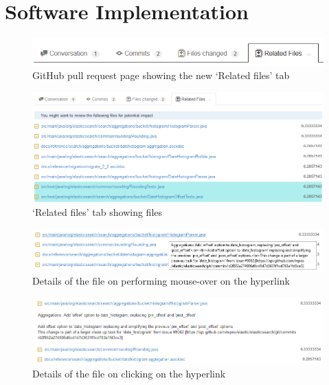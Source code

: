 
\section{Software Implementation}
\label{sec:setup}

\begin{figure}[ht!]
\centering
\includegraphics[width=16cm]{NewTabRelatedFiles}
\caption{GitHub pull request page showing the new `Related files' tab}
\label{fig:newTabRelated}
\end{figure}

\begin{figure}[ht!]
\centering
\includegraphics[width=16cm]{RelatedFilesContents}
\caption{`Related files' tab showing files}
\label{fig:relatedFilesContents}
\end{figure}

\begin{figure}[ht!]
\centering
\includegraphics[width=16cm]{MouseOverOfFile}
\caption{Details of the file on performing mouse-over on the hyperlink}
\label{fig:mouseOverOnFile}
\end{figure}

\begin{figure}[ht!]
\centering
\includegraphics[width=16cm]{ClickOfFileHyperlink}
\caption{Details of the file on clicking on the hyperlink}
\label{fig:clickOnFileHyperlink}
\end{figure}


